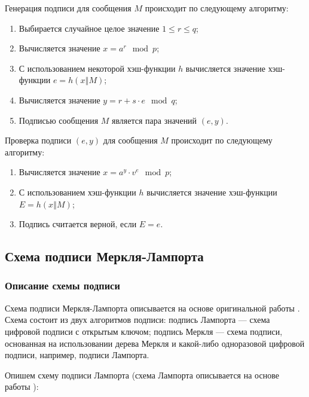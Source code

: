 \documentclass{./civarticle}
\begin{document}
Генерация подписи для сообщения $M$ происходит по следующему алгоритму:

\begin{enumerate}
    \item Выбирается случайное целое значение $1 \leq r \leq q$;
    \item Вычисляется значение $x = a^r \mod p$;
    \item С использованием некоторой хэш-функции $h$ вычисляется значение хэш-функции $e = h(x \mathbin\Vert M)$;
    \item Вычисляется значение $y = r + s\cdot e \mod q$;
    \item Подписью сообщения $M$ является пара значений $(e, y)$.
\end{enumerate}

Проверка подписи $(e, y)$ для сообщения $M$ происходит по следующему алгоритму:

\begin{enumerate}
    \item Вычисляется значение $x = a^y\cdot v^e \mod p$;
    \item С использованием хэш-функции $h$ вычисляется значение хэш-функции $E = h(x \mathbin\Vert M)$;
    \item Подпись считается верной, если $E = e$.
\end{enumerate}

\subsection{Схема подписи Меркля-Лампорта}

\subsubsection{Описание схемы подписи}

Схема подписи Меркля-Лампорта описывается на основе оригинальной работы \cite{merkle}. Схема состоит из двух алгоритмов подписи: подпись Лампорта --- схема цифровой подписи с открытым ключом; подпись Меркля --- схема подписи, основанная на использовании дерева Меркля и какой-либо одноразовой цифровой подписи, например, подписи Лампорта.

Опишем схему подписи Лампорта (схема Лампорта описывается на основе работы \cite{lamport}):
\end{document}
